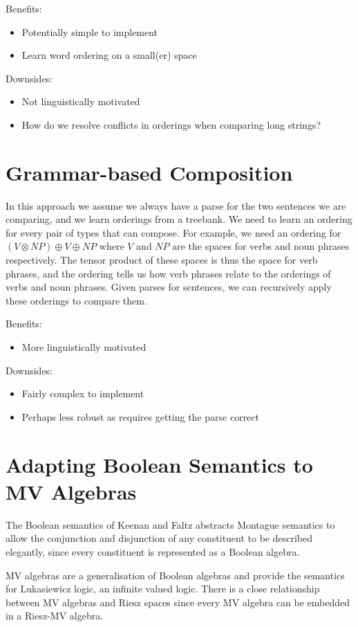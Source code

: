 \documentclass{article}
\begin{document}
Benefits:
\begin{itemize}
\item Potentially simple to implement
\item Learn word ordering on a small(er) space
\end{itemize}
Downsides:
\begin{itemize}
\item Not linguistically motivated
\item How do we resolve conflicts in orderings when comparing long strings?
\end{itemize}

\section{Grammar-based Composition}

In this approach we assume we always have a parse for the two sentences we
are comparing, and we learn orderings from a treebank. We need to
learn an ordering for every pair of types that can compose. For
example, we need an ordering for $(V\otimes\mathit{NP})\oplus
V\oplus\mathit{NP}$ where $V$ and $\mathit{NP}$ are the spaces for
verbs and noun phrases respectively. The tensor product of these
spaces is thus the space for verb phrases, and the ordering tells us
how verb phrases relate to the orderings of verbs and noun
phrases. Given parses for sentences, we can recursively apply these
orderings to compare them.

Benefits:
\begin{itemize}
\item More linguistically motivated
\end{itemize}
Downsides:
\begin{itemize}
\item Fairly complex to implement
\item Perhaps less robust as requires getting the parse correct
\end{itemize}

\section{Adapting Boolean Semantics to MV Algebras}

The Boolean semantics of Keenan and Faltz abstracts Montague semantics
to allow the conjunction and disjunction of any constituent to be
described elegantly, since every constituent is represented as a
Boolean algebra.

MV algebras are a generalisation of Boolean algebras and provide the
semantics for Lukasiewicz logic, an infinite valued logic. There is a
close relationship between MV algebras and Riesz spaces since every MV
algebra can be embedded in a Riesz-MV algebra.
\end{document}
